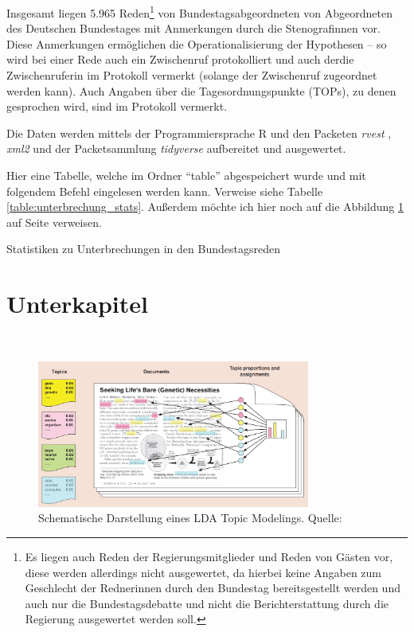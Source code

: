 \documentclass[12pt, 
    twoside=false, 
    bibliography=totoc, 
    numbers=endperiod, 
    headings=normal, 
    toc=chapterentrydotfill
    ]{scrbook}
\begin{document}
Insgesamt liegen 5.965 Reden\footnote{Es liegen auch Reden der Regierungsmitglieder und Reden von Gästen vor, diese werden allerdings nicht ausgewertet, da hierbei keine Angaben zum Geschlecht der Redner\*innen durch den Bundestag bereitsgestellt werden und auch nur die Bundestagsdebatte und nicht die Berichterstattung durch die Regierung ausgewertet werden soll.} von Bundestagsabgeordneten von Abgeordneten des Deutschen Bundestages mit Anmerkungen durch die Stenograf\*innen vor. Diese Anmerkungen ermöglichen die Operationalisierung der Hypothesen -- so wird bei einer Rede auch ein Zwischenruf protokolliert und auch der\*die Zwischenrufer\*in im Protokoll vermerkt (solange der Zwischenruf zugeordnet werden kann). Auch Angaben über die Tagesordnungspunkte (TOPs), zu denen gesprochen wird, sind im Protokoll vermerkt.

Die Daten werden mittels der Programmiersprache R \parencite{rcoreteam_2018} und den Packeten \emph{rvest} \parencite{wickham_2016}, \emph{xml2} \parencite{wickham_2018} und der Packetsammlung \emph{tidyverse} \parencite{wickham_2017} aufbereitet und ausgewertet.


Hier eine Tabelle, welche im Ordner \enquote{table} abgespeichert wurde und mit folgendem Befehl eingelesen werden kann. Verweise siehe Tabelle \ref{table:unterbrechung_stats}. Außerdem möchte ich hier noch auf die Abbildung \ref{fig:lda_example} auf Seite \pageref{fig:lda_example} verweisen. 

\begin{table}[htb]
    \centering
    \caption{Statistiken zu Unterbrechungen in den Bundestagsreden}
    
    \label{table:unterbrechung_stats}
\end{table}

\Blindtext

\section{Unterkapitel}

\blindtext \\

\begin{figure}
    \centering
    \includegraphics[width=0.8\textwidth]{document/images/lda_topic_model.png}
    \caption[Schematische Darstellung eines LDA Topic Modelings]{Schematische Darstellung eines LDA Topic Modelings. Quelle:  \parencite{blei_2012}}
    \label{fig:lda_example}
\end{figure}
\end{document}
